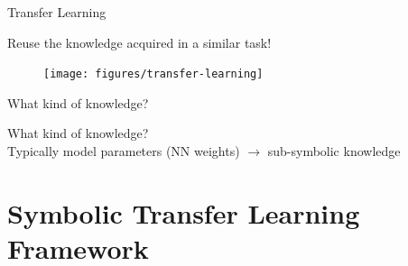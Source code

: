 \documentclass[presentation]{beamer}\mode<presentation>{\usetheme{blackAMSBolognaFC}}
\begin{document}
\begin{frame}[allowframebreaks]{Transfer Learning}

    \centering
    Reuse the knowledge acquired in a \alert{similar} task!~

    \framebreak

    \begin{figure}
        \texttt{[image: figures/transfer-learning]}
    \end{figure}

    \framebreak

    \centering
    What kind of knowledge?
    \vspace{0.5cm}

    \framebreak

    \centering
    What kind of knowledge?
    \\
    \vspace{0.5cm}
    Typically model parameters (NN weights) $\rightarrow$ \alert{sub-symbolic} knowledge

\end{frame}

\section{Symbolic Transfer Learning Framework}
\end{document}
